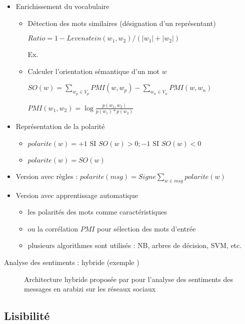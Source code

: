 \documentclass{KodeBook}
\begin{document}
	\begin{itemize}
	\item Enrichissement du vocabulaire
	\begin{itemize}
		\item Détection des mots similaires (désignation d'un représentant)
		
		$Ratio = 1 - Levenstein(w_1, w_2)/(|w_1|+|w_2|)$
		
		Ex. 
		
		\item Calculer l'orientation sémantique d'un mot $w$
		
		
		$SO(w) = \sum_{w_p \in V_p} PMI(w, w_p) - \sum_{w_n \in V_n} PMI(w, w_n)$
		
		$PMI (w_1, w_2) = \log \frac{p(w_1, w_2)}{p(w_1)*p(w_2)}$
	\end{itemize}
	\item Représentation de la polarité
	\begin{itemize}
		\item $polarite(w) = +1 \text{ SI } SO(w) > 0; -1 \text{ SI } SO(w) < 0$
		\item $polarite(w) = SO(w)$
	\end{itemize}
	\item Version avec règles : $polarite(msg) = Signe \sum_{w \in msg} polarite(w)$
	\item Version avec apprentissage automatique
	\begin{itemize}
		\item les polarités des mots comme caractéristiques
		\item ou la corrélation $PMI$ pour sélection des mots d'entrée
		\item plusieurs algorithmes sont utilisés : NB, arbres de décision, SVM, etc.
	\end{itemize}
\end{itemize}

Analyse des sentiments : hybride (exemple \cite{18-guellil-al}) 
\begin{figure}
	\centering
	\caption{Architecture hybride proposée par \cite{18-guellil-al} pour l'analyse des sentiments des messages en arabizi sur les réseaux sociaux}
\end{figure}

\subsection{Lisibilité}
\end{document}
